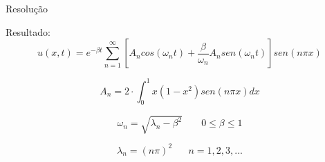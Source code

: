 \documentclass{beamer}
\begin{document}
\begin{frame}{Resolução}
\begin{block} {Resultado:}
\begin{equation*}
    u(x, t) = e^{-\beta t}\sum_{n=1}^{\infty}\left [A_n cos (\omega_n t) + \dfrac{\beta}{\omega_n}A_n sen (\omega_n t)\right ] sen (n \pi x)
\end{equation*}

\begin{equation*}
    A_n = 2 \cdot \int_{0}^{1}  x(1-x^2) sen (n \pi x) dx
\end{equation*}

\begin{equation*}
    \omega_n = \sqrt{\lambda_n - \beta^2} \;\;\;\;\;\;\; 0 \leq \beta \leq 1
\end{equation*}

\begin{equation*}
    \lambda_n = (n \pi)^2 \;\;\;\;\;\; n = 1,2,3,...
\end{equation*}

\end{block}

\end{frame}
\end{document}

